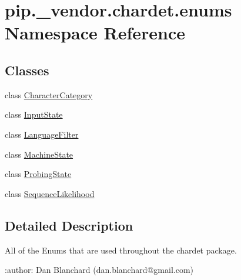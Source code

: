 \hypertarget{namespacepip_1_1__vendor_1_1chardet_1_1enums}{}\section{pip.\+\_\+vendor.\+chardet.\+enums Namespace Reference}
\label{namespacepip_1_1__vendor_1_1chardet_1_1enums}
\subsection*{Classes}
\begin{DoxyCompactItemize}
\item 
class \hyperlink{classpip_1_1__vendor_1_1chardet_1_1enums_1_1CharacterCategory}{Character\+Category}
\item 
class \hyperlink{classpip_1_1__vendor_1_1chardet_1_1enums_1_1InputState}{Input\+State}
\item 
class \hyperlink{classpip_1_1__vendor_1_1chardet_1_1enums_1_1LanguageFilter}{Language\+Filter}
\item 
class \hyperlink{classpip_1_1__vendor_1_1chardet_1_1enums_1_1MachineState}{Machine\+State}
\item 
class \hyperlink{classpip_1_1__vendor_1_1chardet_1_1enums_1_1ProbingState}{Probing\+State}
\item 
class \hyperlink{classpip_1_1__vendor_1_1chardet_1_1enums_1_1SequenceLikelihood}{Sequence\+Likelihood}
\end{DoxyCompactItemize}


\subsection{Detailed Description}
\begin{DoxyVerb}All of the Enums that are used throughout the chardet package.

:author: Dan Blanchard (dan.blanchard@gmail.com)
\end{DoxyVerb}
 
